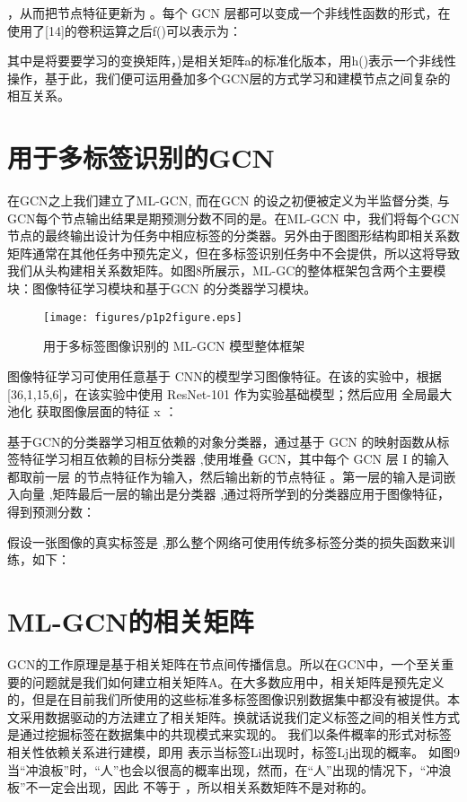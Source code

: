 ，从而把节点特征更新为 。每个 GCN 层都可以变成一个非线性函数的形式，在使用了[14]的卷积运算之后f()可以表示为：
  
其中是将要要学习的变换矩阵，)是相关矩阵a的标准化版本，用h()表示一个非线性操作，基于此，我们便可运用叠加多个GCN层的方式学习和建模节点之间复杂的相互关系。


\section{用于多标签识别的GCN}

在GCN之上我们建立了ML-GCN, 	而在GCN 的设之初便被定义为半监督分类, 与GCN每个节点输出结果是期预测分数不同的是。在ML-GCN 中，我们将每个GCN节点的最终输出设计为任务中相应标签的分类器。另外由于图图形结构即相关系数矩阵通常在其他任务中预先定义，但在多标签识别任务中不会提供，所以这将导致我们从头构建相关系数矩阵。如图8所展示，ML-GC的整体框架包含两个主要模块：图像特征学习模块和基于GCN 的分类器学习模块。

\begin{figure}[htbp!]
	\centering
	\texttt{[image: figures/p1p2figure.eps]}
	\caption{用于多标签图像识别的 ML-GCN 模型整体框架}\label{fig:simuP1P2Result}
	\vspace{-1em}
\end{figure}

图像特征学习可使用任意基于 CNN的模型学习图像特征。在该的实验中，根据[36,1,15,6]，在该实验中使用 ResNet-101 作为实验基础模型；然后应用 全局最大池化 获取图像层面的特征 x ：

基于GCN的分类器学习相互依赖的对象分类器，通过基于 GCN 的映射函数从标签特征学习相互依赖的目标分类器 ,使用堆叠 GCN，其中每个 GCN 层 I 的输入都取前一层 的节点特征作为输入，然后输出新的节点特征 。第一层的输入是词嵌入向量 ,矩阵最后一层的输出是分类器 ,通过将所学到的分类器应用于图像特征，得到预测分数：


假设一张图像的真实标签是 ,那么整个网络可使用传统多标签分类的损失函数来训练，如下：

\section{ML-GCN的相关矩阵}
GCN的工作原理是基于相关矩阵在节点间传播信息。所以在GCN中，一个至关重要的问题就是我们如何建立相关矩阵A。在大多数应用中，相关矩阵是预先定义的，但是在目前我们所使用的这些标准多标签图像识别数据集中都没有被提供。本文采用数据驱动的方法建立了相关矩阵。换就话说我们定义标签之间的相关性方式是通过挖掘标签在数据集中的共现模式来实现的。
我们以条件概率的形式对标签相关性依赖关系进行建模，即用 表示当标签Li出现时，标签Lj出现的概率。 如图9当“冲浪板”时，“人”也会以很高的概率出现，然而，在“人”出现的情况下，“冲浪板”不一定会出现，因此 不等于 ，所以相关系数矩阵不是对称的。

